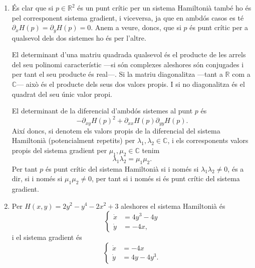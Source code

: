 \documentclass[12pt]{report}
\numberwithin{table}{section}
\numberwithin{equation}{section}
\numberwithin{figure}{section}
\newcommand{\R}{\mathbb{R}}
\newcommand{\C}{\mathbb{C}}
\begin{document}
\begin{enumerate}[label=(\roman*), font=\bfseries \sffamily, wide, labelwidth=!, labelindent=0pt]
	\item	És clar que si \( p \in \R^2 \) és un punt crític per un sistema Hamiltonià també ho és pel corresponent sistema gradient, i viceversa, ja que en ambdós casos es té \( \partial_x H(p) = \partial_y H(p) = 0 \). Anem a veure, doncs, que si \( p \) és punt crític per a qualsevol dels dos sistemes ho és per l'altre.   

		El determinant d'una matriu quadrada qualsevol és el producte de les arrels del seu polinomi característic ---si són complexes aleshores són conjugades i per tant el seu producte és real---. Si la matriu diagonalitza ---tant a \( \R \) com a \( \C	\)--- això és el producte dels seus dos valors propis. I si no diagonalitza és el quadrat del seu únic valor propi. 

		El determinant de la diferencial d'ambdós sistemes al punt \( p \) és
		\begin{equation*}
			- \partial_{xy}H(p)^2 + \partial_{xx}H(p) \partial_{yy}H(p).
		\end{equation*}
		Així doncs, si denotem els valors propis de la diferencial del sistema Hamiltonià (potencialment repetits) per \( \lambda_1, \lambda_2 \in \C \), i els corresponents valors propis del sistema gradient per \( \mu_1, \mu_2 \in \C \) tenim
		\begin{equation*}
			\lambda_1 \lambda_2 = \mu_1 \mu_2.
		\end{equation*}
		Per tant \( p \) és punt crític del sistema Hamiltonià si i només si \( \lambda_1 \lambda_2 \neq 0 \), és a dir, si i només si \( \mu_1 \mu_2 \neq 0 \), per tant si i només si és punt crític del sistema gradient. 

	\item Per \( H(x,y) = 2y^2 - y^4 - 2x^2 + 3 \) aleshores el sistema Hamiltonià és 
		\begin{equation}\label{eq:hamiltonia}
			\left\{ 
				\begin{aligned}
					\dot{x} & = 4y^3 - 4y \\
					\dot{y} & = -4x,
				\end{aligned} 
			\right. 
		\end{equation}
		i el sistema gradient és 
		\begin{equation}\label{eq:gradient}
			\left\{ 
				\begin{aligned}
					\dot{x} & = -4x \\
					\dot{y} & = 4y - 4y^3.
				\end{aligned} 
			\right. 
		\end{equation}


\end{enumerate}
\end{document}
